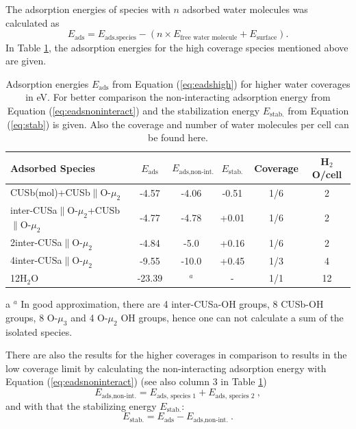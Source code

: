 \documentclass[11pt,DIV=13,BCOR=5mm,a4paper,headinclude]{scrbook}
\begin{document}
The adsorption energies of species with $n$ adsorbed water molecules was calculated as
\begin{equation}\label{eq:eadshigh}
 E_\textrm{ads}=E_\textrm{ads.species}-(n\times E_\text{free water molecule}+E_\text{surface}).
\end{equation}
In Table \ref{tab:higher_water}, the adsorption energies for the high coverage species mentioned above are given.
\begin{table}[!ht]
  \centering
 \caption{Adsorption energies $E_\textrm{ads}$ from Equation (\ref{eq:eadshigh}) for higher water coverages in eV.
For better comparison the non-interacting adsorption energy from Equation (\ref{eq:eadsnoninteract}) and the stabilization energy $E_\textrm{stab.}$ from Equation (\ref{eq:stab}) is given.
Also the coverage and number of water molecules per cell can be found here.
\vspace*{.2cm} 
  }
  \begin{tabular}{lccccc}
  \toprule
  Adsorbed Species  & $E_\textrm{ads}$ & $E_\textrm{ads,non-int.}$& $E_\textrm{stab.}$& Coverage &H$_2$O/cell\\\midrule
   CUSb(mol)+CUSb$\parallel$O-$\mu_2$ & -4.57 & -4.06&-0.51&1/6&2\\
   inter-CUSa$\parallel$O-$\mu_2$+CUSb$\parallel$O-$\mu_2$ & -4.77 & -4.78&+0.01&1/6&2\\
   2inter-CUSa$\parallel$O-$\mu_2$& -4.84 &-5.0&+0.16&1/6&2 \\\hline
   4inter-CUSa$\parallel$O-$\mu_2$ & -9.55 & -10.0&+0.45&1/3&4\\\hline
   12H$_2$O & -23.39& $^a$\tnote{a} &-&1/1& 12\\\bottomrule
  \end{tabular}
  \label{tab:higher_water}
  \begin{tablenotes}\footnotesize 
    \item[a] $^a$ In good approximation, there are 4 inter-CUSa-OH groups, 8 CUSb-OH groups, 8 O-$\mu_3$ and 4 O-$\mu_2$ OH groups, hence one can not calculate a sum of the isolated species.
  \end{tablenotes}
\end{table}
There are also the results for the higher coverages in comparison to results in the low coverage limit by calculating the non-interacting adsorption energy with Equation (\ref{eq:eadsnoninteract}) (see also column 3 in Table \ref{tab:higher_water})
\begin{equation}\label{eq:eadsnoninteract}
 E_\textrm{ads,non-int.}=E_\textrm{ads, species 1} + E_\textrm{ads, species 2}~,
\end{equation}
and with that the stabilizing energy $E_\textrm{stab.}$:
\begin{equation}\label{eq:stab}
 E_\textrm{stab.}=E_\textrm{ads}-E_\textrm{ads,non-int.}~.
\end{equation}
\end{document}
